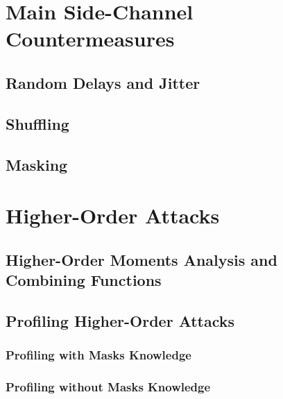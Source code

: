 \section{Main Side-Channel Countermeasures}
\subsection{Random Delays and Jitter}
\subsection{Shuffling}
\subsection{Masking}\label{sec:masking}



\section{Higher-Order Attacks}
\subsection{Higher-Order Moments Analysis and Combining Functions}
\subsection{Profiling Higher-Order Attacks}
\subsubsection{Profiling with Masks Knowledge}
\subsubsection{Profiling without Masks Knowledge}

